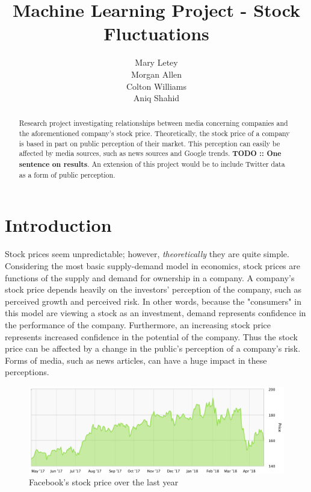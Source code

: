 \documentclass{article}
\title{Machine Learning Project - Stock Fluctuations}
\author{
  Mary Letey \\
  \And
  Morgan Allen \\
  \And
  Colton Williams \\
  \And
  Aniq Shahid 
}
\begin{document}
\maketitle

\begin{abstract}
  Research project investigating relationships between media concerning companies and the aforementioned company's stock price. Theoretically, the stock price of a company is based in part on public perception of their market. This perception can easily be affected by media sources, such as news sources and Google trends. \textbf{TODO :: One sentence on results}. An extension of this project would be to include Twitter data as a form of public perception. 
\end{abstract}
 
\section{Introduction}

Stock prices seem unpredictable; however, \emph{theoretically} they are quite simple. Considering the most basic supply-demand model in economics, stock prices are functions of the supply and demand for ownership in a company. A company's stock price depends heavily on the investors' perception of the company, such as perceived growth and perceived risk. In other words, because the "consumers" in this model are viewing a stock as an investment, demand represents confidence in the performance of the company. Furthermore, an increasing stock price represents increased confidence in the potential of the company. Thus the stock price can be affected by a change in the public's perception of a company's risk. Forms of media, such as news articles, can have a huge impact in these perceptions.

\begin{figure}[h]
    \includegraphics[scale=0.5]{FacebookYear.png}
  \caption{Facebook's stock price over the last year}
  \label{fig:faceplant}
\end{figure}
\end{document}
